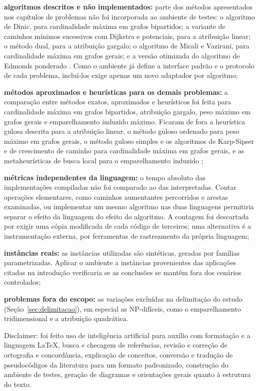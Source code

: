 \begin{alineas}
    \item \textbf{algoritmos descritos e não implementados:} parte dos métodos apresentados nos capítulos de problemas não foi incorporada ao ambiente de testes: o algoritmo de Dinic, para cardinalidade máxima em grafos bipartidos; a variante de caminhos mínimos sucessivos com Dijkstra e potenciais, para a atribuição linear; o método dual, para a atribuição gargalo; o algoritmo de Micali e Vazirani, para cardinalidade máxima em grafos gerais; e a versão otimizada do algoritmo de Edmonds ponderado \cite{galil_micali_gabow}. Como o ambiente já define a interface padrão e o protocolo de cada problema, incluí-los exige apenas um novo adaptador por algoritmo;
    \item \textbf{métodos aproximados e heurísticas para os demais problemas:} a comparação entre métodos exatos, aproximados e heurísticos foi feita para cardinalidade máxima em grafos bipartidos, atribuição gargalo, peso máximo em grafos gerais e emparelhamento induzido máximo. Ficaram de fora a heurística gulosa descrita para a atribuição linear, o método guloso ordenado para peso máximo em grafos gerais, o método guloso simples e os algoritmos de Karp-Sipser e de crescimento de caminho para cardinalidade máxima em grafos gerais, e as metaheurísticas de busca local para o emparelhamento induzido \cite{furst};
    \item \textbf{métricas independentes da linguagem:} o tempo absoluto das implementações compiladas não foi comparado ao das interpretadas. Contar operações elementares, como caminhos aumentantes percorridos e arestas examinadas, ou implementar um mesmo algoritmo nas duas linguagens permitiria separar o efeito da linguagem do efeito do algoritmo. A contagem foi descartada por exigir uma cópia modificada de cada código de terceiros; uma alternativa é a instrumentação externa, por ferramentas de rastreamento da própria linguagem;
    \item \textbf{instâncias reais:} as instâncias utilizadas são sintéticas, geradas por famílias parametrizadas. Aplicar o ambiente a instâncias provenientes das aplicações citadas na introdução verificaria se as conclusões se mantêm fora dos cenários controlados;
    \item \textbf{problemas fora do escopo:} as variações excluídas na delimitação do estudo (Seção~\ref{sec:delimitacao}), em especial as NP-difíceis, como o emparelhamento tridimensional e a atribuição quadrática.
\end{alineas}


\newpage
Disclaimer: foi feito uso de inteligência artificial para auxílio com formatação e a linguagem LaTeX, busca e checagem de referências, revisão e correção de ortografia e concordância, explicação de conceitos, conversão e tradução de pseudocódigos da literatura para um formato padronizado, construção do ambiente de testes, geração de diagramas e orientações gerais quanto à estrutura do texto.
